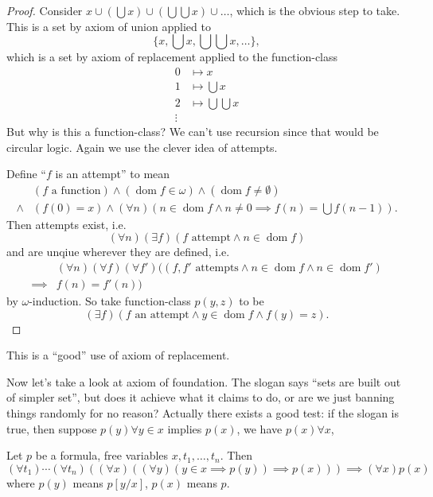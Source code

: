 \documentclass[a4paper]{article}
\DeclareMathOperator{\dom}{dom} %
\begin{document}
\begin{proof}
  Consider \(x \cup (\bigcup x) \cup (\bigcup \bigcup x) \cup \dots\), which is the obvious step to take. This is a set by axiom of union applied to
  \[
    \{x, \bigcup x, \bigcup \bigcup x, \dots\},
  \]
  which is a set by axiom of replacement applied to the function-class
  \begin{align*}
    0 &\mapsto x \\
    1 &\mapsto \bigcup x \\
    2 &\mapsto \bigcup \bigcup x \\
    \vdots
  \end{align*}
  But why is this a function-class? We can't use recursion since that would be circular logic. Again we use the clever idea of attempts.

  Define ``\(f\) is an attempt'' to mean
  \begin{align*}
    & (f \text{ a function}) \land (\dom f \in \omega) \land (\dom f \neq \emptyset) \\
    \land & (f(0) = x) \land (\forall n) (n \in \dom f \land n \neq 0 \implies f(n) = \bigcup f(n - 1)).
  \end{align*}
  Then attempts exist, i.e.
   \[
    (\forall n) (\exists f) (f \text{ attempt} \land n \in \dom f)
  \]
  and are unqiue wherever they are defined, i.e.
  \begin{align*}
    & (\forall n) (\forall f) (\forall f') ((f, f' \text{ attempts} \land n \in \dom f \land n \in \dom f') \\
    \implies & f(n) = f'(n))
  \end{align*}
  by \(\omega\)-induction. So take function-class \(p(y, z)\) to be
  \[
    (\exists f) (f \text{ an attempt} \land y \in \dom f \land f(y) = z).
  \]
\end{proof}

\begin{remark}
  This is a ``good'' use of axiom of replacement.
\end{remark}

Now let's take a look at axiom of foundation. The slogan says ``sets are built out of simpler set'', but does it achieve what it claims to do, or are we just banning things randomly for no reason? Actually there exists a good test: if the slogan is true, then suppose \(p(y) \forall y \in x\) implies \(p(x)\), we have \(p(x) \forall x\), 

\begin{theorem}
  Let \(p\) be a formula, free variables \(x, t_1, \dots, t_n\). Then
  \[
    (\forall t_1) \cdots (\forall t_n) ((\forall x) ((\forall y) (y \in x \implies p(y)) \implies p(x))) \implies (\forall x) p(x)
  \]
  where \(p(y)\) means \(p[y/x]\), \(p(x)\) means \(p\).
\end{theorem}
\end{document}
